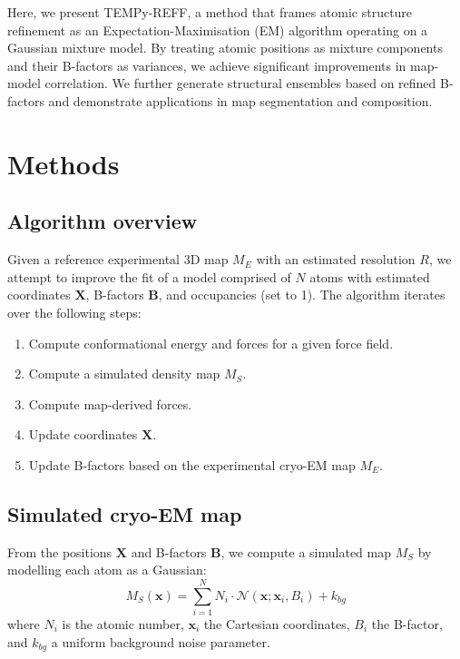 \documentclass[11pt]{article}
\begin{document}
Here, we present TEMPy-REFF, a method that frames atomic structure refinement as an Expectation-Maximisation (EM) algorithm operating on a Gaussian mixture model. By treating atomic positions as mixture components and their B-factors as variances, we achieve significant improvements in map-model correlation. We further generate structural ensembles based on refined B-factors and demonstrate applications in map segmentation and composition.

\section{Methods}

\subsection{Algorithm overview}

Given a reference experimental 3D map $M_E$ with an estimated resolution $R$, we attempt to improve the fit of a model comprised of $N$ atoms with estimated coordinates $\mathbf{X}$, B-factors $\mathbf{B}$, and occupancies (set to 1). The algorithm iterates over the following steps:
\begin{enumerate}
    \item Compute conformational energy and forces for a given force field.
    \item Compute a simulated density map $M_S$.
    \item Compute map-derived forces.
    \item Update coordinates $\mathbf{X}$.
    \item Update B-factors based on the experimental cryo-EM map $M_E$.
\end{enumerate}

\subsection{Simulated cryo-EM map}

From the positions $\mathbf{X}$ and B-factors $\mathbf{B}$, we compute a simulated map $M_S$ by modelling each atom as a Gaussian:
\begin{equation}
    M_S(\mathbf{x}) = \sum_{i=1}^{N} N_i \cdot \mathcal{N}(\mathbf{x}; \mathbf{x}_i, B_i) + k_{bg}
\end{equation}
where $N_i$ is the atomic number, $\mathbf{x}_i$ the Cartesian coordinates, $B_i$ the B-factor, and $k_{bg}$ a uniform background noise parameter.
\end{document}
